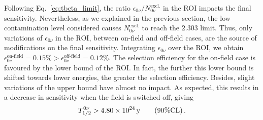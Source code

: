 Following Eq.~\eqref{eq:tbeta_limit}, the ratio $\epsilon_{0\nu}/N_{0\nu}^{\text{excl.}}$ in the ROI impacts the final sensitivity.
Nevertheless, as we explained in the previous section, the low contamination level considered causes $N_{0\nu}^{\text{excl.}}$ to reach the $2.303$ limit.
Thus, only variations of $\epsilon_{0\nu}$ in the ROI, between on-field and off-field cases, are the source of modifications on the final sensitivity.
Integrating $\epsilon_{0\nu}$ over the ROI, we obtain $\epsilon_{0\nu}^{\text{on-field}}=0.15\%>\epsilon_{0\nu}^{\text{off-field}}=0.12\%$.
The selection efficiency for the on-field case is favoured by the lower bound of the ROI.
In fact, the further this lower bound is shifted towards lower energies, the greater the selection efficiency.
Besides, slight variations of the upper bound have almost no impact.
As expected, this results in a decrease in sensitivity when the field is switched off, giving
\begin{equation}
T_{1/2}^{0\nu} > 4.80\times 10^{24}\,\text{y}\qquad (90\% \text{CL})\,.
\end{equation}

